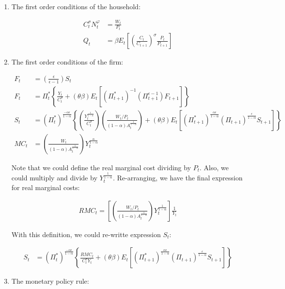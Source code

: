 \documentclass[11pt]{article}
\begin{document}
\begin{enumerate}
\item The first order conditions of the household:

\begin{align}
C_t^{\sigma}N_t^{\varphi}&=\frac{W_t}{P_t}\label{eq1}\\
Q_t&=\beta E_t\left[\left(\frac{C_t}{C_{t+1}}\right)^{\sigma}\frac{P_t}{P_{t+1}}\right]\label{eq2}
\end{align}

\item The first order conditions of the firm:

\begin{align}
F_t&=\left(\frac{\epsilon}{\epsilon-1}\right)S_t\label{eq3}\\
F_t&=\Pi_t^*\left\{\frac{Y_{t}}{C_{t}^{\sigma}}+(\theta\beta)E_t[(\Pi_{t+1}^*)^{-1}(\Pi_{t+1}^{\epsilon-1})F_{t+1}]\right\}\label{eq4}\\
S_t&=(\Pi_t^*)^{\frac{-\alpha\epsilon}{1-\alpha}}\left\{\left(\frac{Y_{t}^{\frac{1}{1-\alpha}}}{C_{t}^{\sigma}}\right)\left(\frac{W_{t}/P_{t}}{(1-\alpha)A_{t}^{\frac{1}{1-\alpha}}}\right)+(\theta\beta)E_t[(\Pi_{t+1}^*)^{\frac{\alpha\epsilon}{1-\alpha}}(\Pi_{t+1})^{\frac{\epsilon}{1-\alpha}}S_{t+1}]\right\}\nonumber\\
MC_t&=\left(\frac{W_t}{(1-\alpha)A_t^{\frac{1}{1-\alpha}}}\right)Y_t^{\frac{\alpha}{1-\alpha}}\nonumber
\end{align}

Note that we could define the real marginal cost dividing by $P_t$. Also, we could multiply and divide by $Y_t^{\frac{1}{1-\alpha}}$. Re-arranging, we have the final expression for real marginal costs:

\begin{align}
RMC_t=\left[\left(\frac{W_t/P_t}{(1-\alpha)A_t^{\frac{1}{1-\alpha}}}\right)Y_t^{\frac{1}{1-\alpha}}\right]\frac{1}{Y_t}\label{eq5}
\end{align}

With this definition, we could re-writte expression $S_t$:

\begin{align}
S_t&=(\Pi_t^*)^{\frac{-\alpha\epsilon}{1-\alpha}}\left\{\frac{RMC_t}{C_t^{\sigma}Y_t}+(\theta\beta)E_t[(\Pi_{t+1}^*)^{\frac{\alpha\epsilon}{1-\alpha}}(\Pi_{t+1})^{\frac{\epsilon}{1-\alpha}}S_{t+1}]\right\}\label{eq6}
\end{align}

\item The monetary policy rule:


\end{enumerate}
\end{document}
